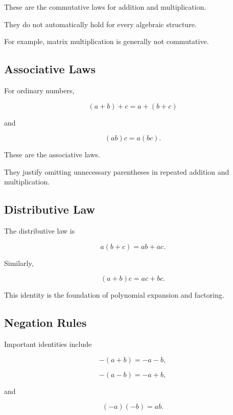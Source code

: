 These are the commutative laws for addition and multiplication.

They do not automatically hold for every algebraic structure.

For example, matrix multiplication is generally not commutative.

\subsection{Associative Laws}
\label{subsec:associative-laws-reference}

For ordinary numbers,

\[
\boxed{
(a+b)+c
=
a+(b+c)
}
\]

and

\[
\boxed{
(ab)c
=
a(bc).
}
\]

These are the associative laws.

They justify omitting unnecessary parentheses in repeated addition and
multiplication.

\subsection{Distributive Law}
\label{subsec:distributive-law-reference}

The distributive law is

\[
\boxed{
a(b+c)
=
ab+ac.
}
\]

Similarly,

\[
\boxed{
(a+b)c
=
ac+bc.
}
\]

This identity is the foundation of polynomial expansion and factoring.

\subsection{Negation Rules}
\label{subsec:negation-rules-reference}

Important identities include

\[
\boxed{
-(a+b)
=
-a-b,
}
\]

\[
\boxed{
-(a-b)
=
-a+b,
}
\]

and

\[
\boxed{
(-a)(-b)=ab.
}
\]

